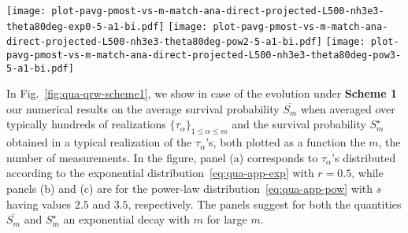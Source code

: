 \documentclass[12pt]{iopart}
\begin{document}
\begin{figure*}[!ht]
\centering
\texttt{[image: plot-pavg-pmost-vs-m-match-ana-direct-projected-L500-nh3e3-theta80deg-exp0-5-a1-bi.pdf]} 
\texttt{[image: plot-pavg-pmost-vs-m-match-ana-direct-projected-L500-nh3e3-theta80deg-pow2-5-a1-bi.pdf]} 
\texttt{[image: plot-pavg-pmost-vs-m-match-ana-direct-projected-L500-nh3e3-theta80deg-pow3-5-a1-bi.pdf]}
\caption{Average and typical survival probability for the QRW subject to instantaneous projective measurements at random times
(\textbf{Scheme 1}). The plots correspond to the initial state~\eqref{eq:qua-psi0}
with $n_0=0,~a=1,~b={\rm i}$ that is subject to repeated projective
measurements at random times to the initial state and subsequent evolution with the
projected component of the instantaneous state. Here, the time intervals $\tau_\alpha$ between two consecutive
measurements are i.i.d.~random variables sampled from the exponential
distribution~\eqref{eq:qua-app-exp} with $r=0.5$ (panel (a)) and
from the power-law distribution~\eqref{eq:qua-app-pow} with
$s=2.5$ (panel (b)) and $s=3.5$ (panel (c)). The angle $\theta$ characterizing the
        QRW evolution operator $C$ has the
        value in radian corresponding to $80$ degrees. The system size
        is $N=500$. In the plots, the points are based on results
        obtained from numerical implementation of the dynamics; while
        the average survival probability $\overline{S_m}$ involves
        averaging over $3000$ realizations of the set $\{\tau_\alpha\}_{1\le
        \alpha \le m}$, the typical survival probability $S_m^\star$
        corresponds to results obtained in a typical realization of the
        $\tau_\alpha$'s. The lines in the plots correspond to analytical
        results given by
        Eqs.~\eqref{eq:qua-Sm-avg-qrw},~\eqref{eq:qua-Sm-typical-qrw},
        and~\eqref{eq:qua-qrw-qtau}.}  
\label{fig:qua-qrw-scheme1}
\end{figure*}

In Fig.~\ref{fig:qua-qrw-scheme1}, we show in case of the evolution
under \textbf{Scheme 1} our numerical results on the average survival
probability $\overline{S_m}$ when averaged over typically hundreds of
realizations $\{\tau_\alpha\}_{1\le \alpha \le m}$ and the survival probability $S_m^\star$
obtained in a typical realization of the $\tau_\alpha$'s, both plotted as a
function the $m$, the number of measurements.  In the figure, panel (a)
corresponds to $\tau_\alpha$'s distributed according to the exponential
distribution~\eqref{eq:qua-app-exp} with $r=0.5$, while panels (b) and (c) are for
the power-law distribution~\eqref{eq:qua-app-pow} with $s$ having values
$2.5$ and $3.5$, respectively. The panels suggest for both
the quantities $\overline{S_m}$ and $S_m^\star$ an
exponential decay with $m$ for large $m$.
\end{document}
